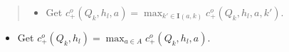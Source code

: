 \documentclass[a4paper,10pt,english]{sphinxmanual}
\begin{document}
{\begin{minipage}{0.95\linewidth}
\begin{quote}
\begin{itemize}
\begin{quote}
\begin{itemize}
\begin{quote}
\begin{itemize}
\item {} 
Get current payoff profile $v(a,b)$

\item {} 
Solve conditional LP:

\end{itemize}
\begin{gather}
\begin{split} c_{+}^{o}(Q_k,h_l,a,k',\lambda,b) &
 = \max_{w} h_l [ (1-\delta)v(a,b) + \delta P w ]
 \\
 s.t. &
\\
 H w & \leq c^{o}(Q_{k'}, h_l)
 \\
 \delta[p^j(a')-p^j(a_j)]\cdot w & \leq (1-\delta) [\phi(a')-\phi(a_j)], \  \forall j \in \mathcal{Z}
 \\
 -\lambda \delta P w &
 \leq \lambda [ (1-\delta)v(a,b) ] - \check{\pi}(Q_{k})\end{split}\notag
\end{gather}\end{quote}

\item {} 
Get $c_{+}^{o}(Q_k,h_l,a,k') = \max_{(\lambda,b) \in F(k';a,k)} c_{+}^{o}(Q_k,h_l,a, k',\lambda,b)$.

\end{itemize}
\end{quote}

\item {} 
Get $c_{+}^{o}(Q_k,h_l,a) = \max_{k' \in \mathbf{I}(a,k)} c_{+}^{o}(Q_k,h_l,a,k')$.

\end{itemize}
\end{quote}
\begin{itemize}
\item {} 
Get $c_{+}^{o}(Q_k,h_l) = \max_{a \in A} c_{+}^{o}(Q_k,h_l,a)$.

\end{itemize}
\end{minipage}}
\begin{center}\setlength{\fboxsep}{5pt}\end{center}

\begin{DUlineblock}{0em}
\item[] 
\item[] 
\end{DUlineblock}
\end{document}
